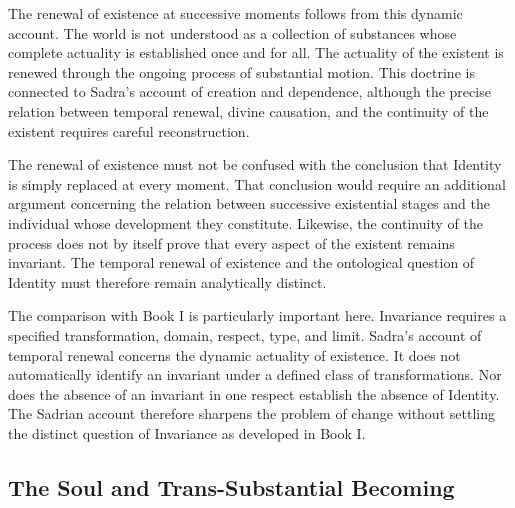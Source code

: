 The renewal of existence
at successive moments follows
from this dynamic account.
The world is not understood
as a collection of substances
whose complete actuality
is established once and
for all. The actuality of
the existent is renewed
through the ongoing process
of substantial motion. This
doctrine is connected to
Sadra's account of creation
and dependence, although
the precise relation between
temporal renewal, divine
causation, and the continuity
of the existent requires
careful reconstruction.

\label{para:VS.B01.P01.C08.S17.SS11.P003}

The renewal of existence
must not be confused with
the conclusion that Identity
is simply replaced at every
moment. That conclusion
would require an additional
argument concerning the
relation between successive
existential stages and the
individual whose development
they constitute. Likewise,
the continuity of the process
does not by itself prove
that every aspect of the
existent remains invariant.
The temporal renewal of
existence and the ontological
question of Identity must
therefore remain analytically
distinct.

\label{para:VS.B01.P01.C08.S17.SS11.P004}

The comparison with Book I
is particularly important
here. Invariance requires
a specified transformation,
domain, respect, type, and
limit. Sadra's account of
temporal renewal concerns
the dynamic actuality of
existence. It does not
automatically identify an
invariant under a defined
class of transformations.
Nor does the absence of
an invariant in one respect
establish the absence of
Identity. The Sadrian account
therefore sharpens the
problem of change without
settling the distinct question
of Invariance as developed
in Book I.




\subsection{The Soul and Trans-Substantial Becoming}
\label{subsec:ch08_s17_ss12}


